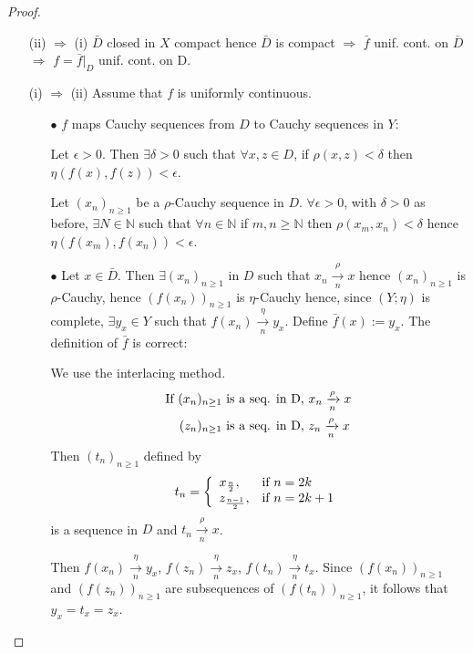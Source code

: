\documentclass[12pt]{amsbook}
\theoremstyle{definition}
\newcommand{\NN}{{\mathbb N}}
\newcommand{\Ra}{\Rightarrow} %
\begin{document}
\begin{proof} \
\begin{itemize}
\item[(ii) $\Ra$ (i)] $\bar D$ closed in $X$ compact hence $\bar D$ is compact $\Ra$ $\bar f$ unif. cont. on $\bar D$ $\Ra$ $f = \bar f|_D$ unif. cont. on D.
\item[(i) $\Ra$ (ii)] Assume that $f$ is uniformly continuous.

\begin{itemize}
\item[$\bullet$] $f$ maps Cauchy sequences from $D$ to Cauchy sequences in $Y$:

Let $\epsilon > 0$. Then $\exists \delta > 0$ such that $\forall x, z \in D$, if $\rho(x,z) < \delta$ then $\eta(f(x), f(z)) < \epsilon$.

Let $(x_n)_{n \geq 1}$ be a $\rho$-Cauchy sequence in $D$.
$\forall \epsilon > 0$, with $\delta > 0$ as before, $\exists N \in \NN$ such that $\forall n \in \NN$ if $m, n \geq \NN$ then $\rho(x_m, x_n) < \delta$ hence $\eta(f(x_m), f(x_n)) < \epsilon$.

\item[$\bullet$] Let $x \in \bar D$. Then $\exists (x_n)_{n \geq 1}$ in $D$ such that $x_n \xrightarrow[n]{\rho} x$ hence $(x_n)_{n \geq 1}$ is $\rho$-Cauchy, hence $(f(x_n))_{n \geq 1}$ is $\eta$-Cauchy hence, since $(Y; \eta)$ is complete, $\exists y_x \in Y$ such that $f(x_n) \xrightarrow[n]{\eta} y_x$. Define $\bar f(x) := y_x$. The definition of $\bar f$ is correct:

We use the interlacing method.
\begin{align*}
\textup{If } 
(x_n)_{n \geq 1} \textup{ is a seq. in D, } & x_n \xrightarrow[n]{\rho} x \\
(z_n)_{n \geq 1} \textup{ is a seq. in D, } & z_n \xrightarrow[n]{\rho} x
\end{align*}
Then $(t_n)_{n \geq 1}$ defined by
\begin{equation*}
t_n =\left\{\begin{array}{ll}{x_{\frac{n}{2}},} & {\textup{if } n = 2k} \\ {z_{\frac{n-1}{2}},} & {\textup{if } n = 2k+1}\end{array}\right.
\end{equation*}
is a sequence in $D$ and $t_n \xrightarrow[n]{\rho} x$. %

Then $f(x_n) \xrightarrow[n]{\eta} y_x$, $f(z_n) \xrightarrow[n]{\eta} z_x$, $f(t_n) \xrightarrow[n]{\eta} t_x$. Since $(f(x_n))_{n \geq 1}$ and $(f(z_n))_{n \geq 1}$ are subsequences of $(f(t_n))_{n \geq 1}$, it follows that $y_x = t_x = z_x$.


\end{itemize}
\end{itemize}
\end{proof}
\end{document}
